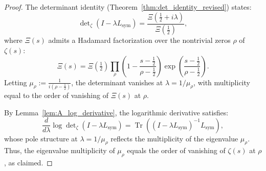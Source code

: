 \begin{proof}
The determinant identity (Theorem~\ref{thm:det_identity_revised}) states:
\[
\det\nolimits_{\zeta}(I - \lambda L_{\mathrm{sym}})
= \frac{\Xi\left(\tfrac{1}{2} + i\lambda\right)}{\Xi\left(\tfrac{1}{2}\right)},
\]
where \( \Xi(s) \) admits a Hadamard factorization over the nontrivial zeros \( \rho \) of \( \zeta(s) \):
\[
\Xi(s) = \Xi\left(\tfrac{1}{2}\right)
\prod_\rho \left(1 - \frac{s - \tfrac{1}{2}}{\rho - \tfrac{1}{2}}\right)
\exp\left( \frac{s - \tfrac{1}{2}}{\rho - \tfrac{1}{2}} \right).
\]
Letting \( \mu_\rho := \frac{1}{i(\rho - \tfrac{1}{2})} \), the determinant vanishes at \( \lambda = 1/\mu_\rho \), with multiplicity equal to the order of vanishing of \( \Xi(s) \) at \( \rho \).

By Lemma~\ref{lem:A_log_derivative}, the logarithmic derivative satisfies:
\[
\frac{d}{d\lambda} \log \det\nolimits_\zeta(I - \lambda L_{\mathrm{sym}})
= \operatorname{Tr}\left( (I - \lambda L_{\mathrm{sym}})^{-1} L_{\mathrm{sym}} \right),
\]
whose pole structure at \( \lambda = 1/\mu_\rho \) reflects the multiplicity of the eigenvalue \( \mu_\rho \). Thus, the eigenvalue multiplicity of \( \mu_\rho \) equals the order of vanishing of \( \zeta(s) \) at \( \rho \), as claimed.
\end{proof}
% 